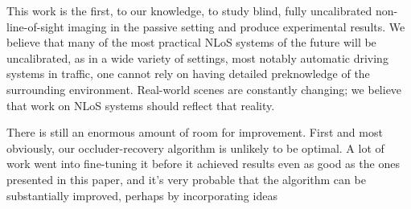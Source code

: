 This work is the first, to our knowledge, to study blind, fully uncalibrated non-line-of-sight imaging in the passive setting and produce experimental results. We believe that many of the most practical NLoS systems of the future will be uncalibrated, as in a wide variety of settings, most notably automatic driving systems in traffic, one cannot rely on having detailed preknowledge of the surrounding environment. Real-world scenes are constantly changing; we believe that work on NLoS systems should reflect that reality.

There is still an enormous amount of room for improvement. First and most obviously, our occluder-recovery algorithm is unlikely to be optimal. A lot of work went into fine-tuning it before it achieved results even as good as the ones presented in this paper, and it's very probable that the algorithm can be substantially improved, perhaps by incorporating ideas 